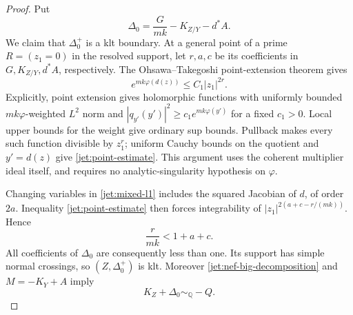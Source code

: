 \begin{proof}
Put
\begin{equation}\label{jet:delta-zero}
 \Delta_0=\frac{G}{mk}-K_{Z/Y}-d^*A.
\end{equation}
We claim that $\Delta_0^+$ is a klt boundary.  At a general point of
a prime $R=(z_1=0)$ in the resolved support, let $r,a,c$ be its
coefficients in $G,K_{Z/Y},d^*A$, respectively.
The Ohsawa--Takegoshi point-extension theorem
\cite{OhsawaTakegoshi1987} gives
\begin{equation}\label{jet:point-estimate}
 e^{mk\varphi(d(z))}\leq C_1|z_1|^{2r}.
\end{equation}
Explicitly, point extension gives holomorphic functions with uniformly
bounded $mk\varphi$-weighted $L^2$ norm and
$|q_{y'}(y')|^2\geq c_1e^{mk\varphi(y')}$ for a fixed $c_1>0$.  Local upper bounds for the weight give
ordinary sup bounds.  Pullback makes every such function divisible by
$z_1^r$; uniform Cauchy bounds on the quotient and $y'=d(z)$ give
\eqref{jet:point-estimate}.  This argument uses the coherent multiplier
ideal itself, and requires no analytic-singularity hypothesis on
$\varphi$.

Changing variables in \eqref{jet:mixed-l1} includes the squared
Jacobian of $d$, of order $2a$.  Inequality
\eqref{jet:point-estimate} then forces integrability of
$|z_1|^{2(a+c-r/(mk))}$.  Hence
\begin{equation}\label{jet:strict-discrepancy}
 \frac r{mk}<1+a+c.
\end{equation}
All coefficients of $\Delta_0$ are consequently less than one.
Its support has simple normal crossings, so $(Z,\Delta_0^+)$ is klt.
Moreover \eqref{jet:nef-big-decomposition} and $M=-K_Y+A$ imply
\[
 K_Z+\Delta_0\sim_{\mathbb Q}-Q.
\]


\end{proof}
